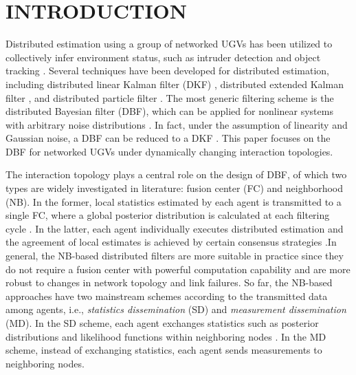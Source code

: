 \section{INTRODUCTION}
	
	Distributed estimation using a group of networked UGVs has been utilized to collectively infer environment status, such as intruder detection \cite{chamberland2007wireless} and object tracking \cite{wang2003online}. 
	Several techniques have been developed for distributed estimation, including distributed linear Kalman filter (DKF) \cite{2005distributed}, distributed extended Kalman filter \cite{madhavan2004distributed}, and distributed particle filter \cite{gu2007distributed}. 
	The most generic filtering scheme is the distributed Bayesian filter (DBF), which can be applied for nonlinear systems with arbitrary noise distributions \cite{bandyopadhyay2014distributed,julian2012distributed}.
	In fact, under the assumption of linearity and Gaussian noise, a DBF can be reduced to a DKF \cite{chen2003bayesian}.
	This paper focuses on the DBF for networked UGVs under dynamically changing interaction topologies.
	
	The interaction topology plays a central role on the design of DBF, of which two types are widely investigated in literature: fusion center (FC) and neighborhood (NB). 
	In the former, local statistics estimated by each agent is transmitted to a single FC, where a global posterior distribution is calculated at each filtering cycle \cite{zuo2006bandwidth,vemula2006target}. 
	In the latter, each agent individually executes distributed estimation and the agreement of local estimates is achieved by certain consensus strategies \cite{jadbabaie2003coordination,ren2005consensus,olfati2007consensus}.In general, the NB-based distributed filters are more suitable in practice since they do not require a fusion center with powerful computation capability and are more robust to changes in network topology and link failures. So far, the NB-based approaches have two mainstream schemes according to the transmitted data among agents, i.e., \textit{statistics dissemination} (SD) and \textit{measurement dissemination} (MD). 
	In the SD scheme, each agent exchanges statistics such as posterior distributions and likelihood functions within neighboring nodes \cite{hlinka2013distributed}. 
	In the MD scheme, instead of exchanging statistics, each agent sends measurements to neighboring nodes. 
	
